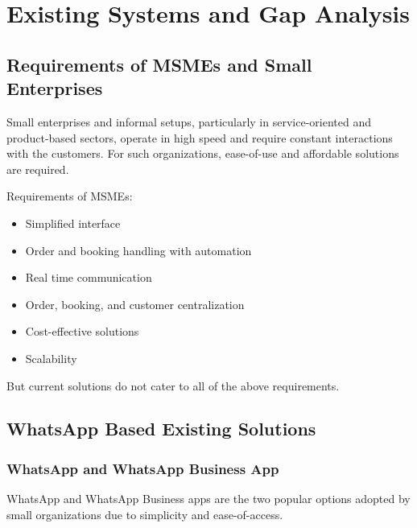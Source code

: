 
\chapter{Existing Systems and Gap Analysis}


\section{Requirements of MSMEs and Small Enterprises}

Small enterprises and informal setups, particularly in service-oriented and product-based sectors, operate in high speed and require constant interactions with the customers. For such organizations, ease-of-use and affordable solutions are required.

Requirements of MSMEs:
\begin{itemize}
    \item Simplified interface
    \item Order and booking handling with automation
    \item Real time communication
    \item Order, booking, and customer centralization
    \item Cost-effective solutions
    \item Scalability
\end{itemize}

But current solutions do not cater to all of the above requirements.


\section{WhatsApp Based Existing Solutions}

\subsection{WhatsApp and WhatsApp Business App}

WhatsApp and WhatsApp Business apps are the two popular options adopted by small organizations due to simplicity and ease-of-access.

